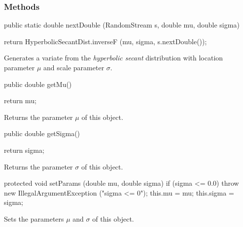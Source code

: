 \subsubsection* {Methods}
\begin{code}

   public static double nextDouble (RandomStream s, double mu, double sigma)\begin{hide} {
      return HyperbolicSecantDist.inverseF (mu, sigma, s.nextDouble());
   }\end{hide}
\end{code}
\begin{tabb} Generates a variate from the {\em hyperbolic secant\/} distribution with
   location parameter $\mu$ and scale parameter $\sigma$.
\end{tabb}
\begin{code}

   public double getMu()\begin{hide} {
      return mu;
   }\end{hide}
\end{code}
 \begin{tabb} Returns the parameter $\mu$ of this object.
 \end{tabb}
\begin{code}

   public double getSigma()\begin{hide} {
      return sigma;
   }\end{hide}
\end{code}
 \begin{tabb} Returns the parameter $\sigma$ of this object.
 \end{tabb}
\begin{hide}\begin{code}

   protected void setParams (double mu, double sigma) {
      if (sigma <= 0.0)
         throw new IllegalArgumentException ("sigma <= 0");
      this.mu = mu;
      this.sigma = sigma;
   }
\end{code}
\begin{tabb}
   Sets the parameters $\mu$ and $\sigma$ of this object.
\end{tabb}
\begin{code}
}
\end{code}
\end{hide}
